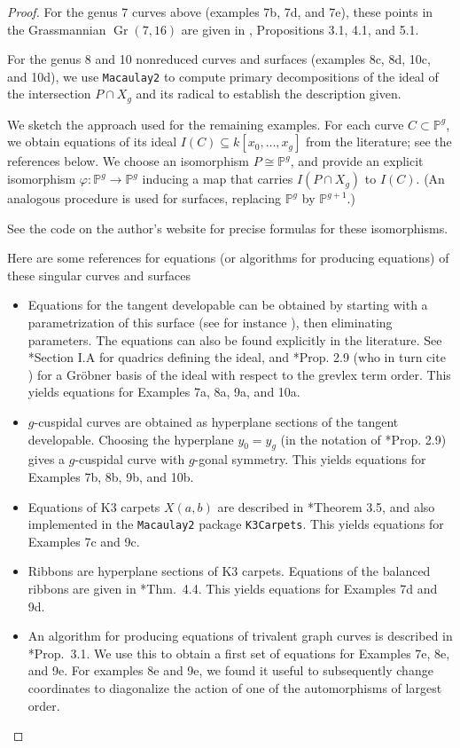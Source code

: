 \documentclass{amsart}[12pt]
\theoremstyle{definition}
\numberwithin{equation}{section}
\newcommand{\Gr}{\operatorname{Gr}}
\begin{document}
\begin{proof}
For the genus 7 curves above (examples 7b, 7d, and 7e), these points in the Grassmannian $\Gr(7,16)$ are given in \cite{Swinarski2025}, Propositions 3.1, 4.1, and 5.1.

For the genus 8 and 10 nonreduced curves and surfaces (examples 8c, 8d,
10c, and 10d), we use \texttt{Macaulay2} to compute primary
decompositions of the ideal of the intersection $P \cap X_g$ and its
radical to establish the description given.

We sketch the approach used for the remaining examples. For each
curve $C \subset \mathbb{P}^g$, we obtain equations of its ideal $I(C) \subseteq k[x_0,\ldots,x_g]$ from the
literature; see the references below. We choose an
isomorphism $P \cong \mathbb{P}^g$, and provide an explicit
isomorphism $\varphi: \mathbb{P}^g \rightarrow \mathbb{P}^g$ inducing
a map that carries $I(P \cap X_g)$ to $I(C)$. (An analogous procedure is used for surfaces,
replacing $\mathbb{P}^g$ by $\mathbb{P}^{g+1}$.)


See the code on the author's website \cite{Code} for precise formulas for these isomorphisms.

Here are some references for equations (or
algorithms for producing equations) of these singular curves and surfaces
\begin{itemize}
\item Equations for the tangent developable can be obtained by
  starting with a parametrization of this surface (see for instance
  \cite{EL}), then eliminating parameters. The equations can also be
  found explicitly in the literature. See \cite{E}*{Section I.A} for
  quadrics defining the ideal, and \cite{BS1990}*{Prop. 2.9} (who in
  turn cite \cite{SchreyerThesis}) for a Gr\"{o}bner basis of the
  ideal with respect to the grevlex term order. This yields 
  equations for Examples 7a, 8a, 9a, and 10a.
\item $g$-cuspidal curves are obtained as hyperplane sections of the
  tangent developable. Choosing the hyperplane $y_0=y_g$ (in the
  notation of \cite{BS1990}*{Prop. 2.9}) gives a $g$-cuspidal curve
  with $g$-gonal symmetry. This yields equations for Examples 7b, 8b,
  9b, and 10b.
\item Equations of K3 carpets $X(a,b)$ are described in
  \cite{ES2019}*{Theorem 3.5}, and also implemented in the
  \texttt{Macaulay2} package \texttt{K3Carpets}. This yields equations
  for Examples 7c and 9c.
\item Ribbons are hyperplane sections of K3 carpets. Equations of the balanced ribbons are given in \cite{DFS2014}*{Thm.~4.4}. This yields equations
  for Examples 7d and 9d.  
\item An algorithm for producing equations of trivalent graph curves
  is described in  \cite{BE1991}*{Prop.~3.1}. We use this to obtain a
  first set of equations for Examples 7e, 8e, and 9e. For examples 8e
  and 9e, we found it useful to subsequently change coordinates to
  diagonalize the action of one of the automorphisms of largest order.
\end{itemize}

\end{proof}
\end{document}
